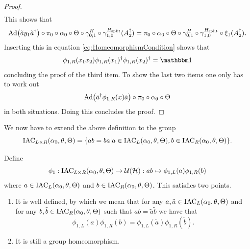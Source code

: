 \documentclass[12pt,a4paper,twoside]{article}
\numberwithin{equation}{section}
\begin{document}
\begin{proof}
\begin{align}
	\end{align}
	This shows that
	\begin{equation}
		\Ad{\tilde{a}y_1\tilde{a}^\dagger}\circ\pi_0\circ\alpha_0\circ\Theta\circ\gamma^H_{0;1}\circ\gamma^{H_\text{split}}_{1;0}(A_2^\dagger)=\pi_0\circ\alpha_0\circ\Theta\circ\gamma^H_{0;1}\circ\gamma^{H_\text{split}}_{1;0}\circ\xi_1(A_2^\dagger).
	\end{equation}
	Inserting this in equation \eqref{eq:HomeomorphismCondition} shows that
	\begin{equation}
		\phi_{1,R}(x_1x_2)\phi_{1,R}(x_1)^\dagger\phi_{1,R}(x_2)^\dagger=\id
	\end{equation}
	concluding the proof of the third item. To show the last two items one only has to work out
	\begin{equation}
		\Ad{\tilde{a}^\dagger \phi_{1,R}(x)\tilde{a}}\circ\pi_0\circ\alpha_0\circ\Theta
	\end{equation}
	in both situations. Doing this concludes the proof.
\end{proof}
We now have to extend the above definition to the group
\begin{equation}
	\textrm{IAC}_{L\times R}(\alpha_0,\theta,\Theta)=\{ab=ba|a\in\textrm{IAC}_{L}(\alpha_0,\theta,\Theta),b\in\textrm{IAC}_{R}(\alpha_0,\theta,\Theta)\}.
\end{equation}
\begin{lemma}\label{lem:extensionOfPhi1Definition}
	Define
	\begin{equation}
		\phi_1:\textrm{IAC}_{L\times R}(\alpha_0,\theta,\Theta)\rightarrow\mathcal U(\mathcal H):ab\mapsto \phi_{1,L}(a)\phi_{1,R}(b)
	\end{equation}
	where $a\in \textrm{IAC}_{L}(\alpha_0,\theta,\Theta)$ and $b\in \textrm{IAC}_{R}(\alpha_0,\theta,\Theta)$. This satisfies two points.
	\begin{enumerate}
		\item It is well defined, by which we mean that for any $a,\tilde{a}\in \textrm{IAC}_{L}(\alpha_0,\theta,\Theta)$ and for any $b,\tilde{b}\in \textrm{IAC}_{R}(\alpha_0,\theta,\Theta)$ such that $ab=\tilde{a}\tilde{b}$ we have that
		\begin{equation}
			\phi_{1,L}(a)\phi_{1,R}(b)=\phi_{1,L}(\tilde a)\phi_{1,R}(\tilde b).
		\end{equation}
		\item It is still a group homeomorphism.
	\end{enumerate}
\end{lemma}
\end{document}
